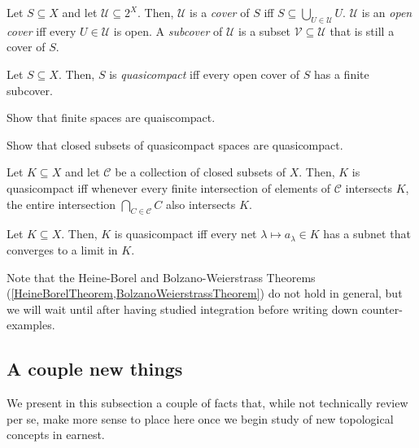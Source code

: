 \begin{dfn}[Cover]
Let $S\subseteq X$ and let $\mathcal{U}\subseteq 2^{X}$.  Then, $\mathcal{U}$ is a \emph{cover} of $S$ iff $S\subseteq \bigcup _{U\in \mathcal{U}}U$.  $\mathcal{U}$ is an \emph{open cover} iff every $U\in \mathcal{U}$ is open.  A \emph{subcover} of $\mathcal{U}$ is a subset $\mathcal{V}\subseteq \mathcal{U}$ that is still a cover of $S$.
\end{dfn}
\begin{dfn}[Quasicompact]\label{Quasicompact}
Let $S\subseteq X$.  Then, $S$ is \emph{quasicompact} iff every open cover of $S$ has a finite subcover.
\end{dfn}
\begin{exr}\label{exr4.2.33x}
Show that finite spaces are quaiscompact.
\end{exr}
\begin{exr}\label{exr4.2.33}
Show that closed subsets of quasicompact spaces are quasicompact.
\end{exr}
\begin{prp}\label{prp4.2.32}
Let $K\subseteq X$ and let $\mathcal{C}$ be a collection of closed subsets of $X$.  Then, $K$ is quasicompact iff whenever every finite intersection of elements of $\mathcal{C}$ intersects $K$, the entire intersection $\bigcap _{C\in \mathcal{C}}C$ also intersects $K$.
\end{prp}
\begin{prp}\label{prp4.2.31}
Let $K\subseteq X$.  Then, $K$ is quasicompact iff every net $\lambda \mapsto a_\lambda \in K$ has a subnet that converges to a limit in $K$.
\end{prp}
Note that the Heine-Borel and Bolzano-Weierstrass Theorems (\cref{HeineBorelTheorem,BolzanoWeierstrassTheorem}) do not hold in general, but we will wait until after having studied integration before writing down counter-examples.

\subsection{A couple new things}

We present in this subsection a couple of facts that, while not technically review per se, make more sense to place here once we begin study of new topological concepts in earnest.


